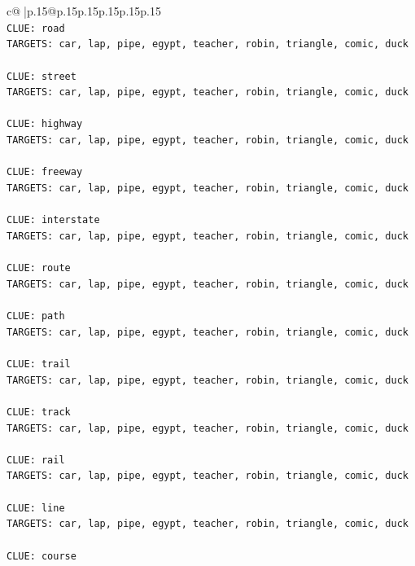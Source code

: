 \documentclass{article}
\begin{document}
{\begin{supertabular}{c@{$\;$}|p{.15\linewidth}@{}p{.15\linewidth}p{.15\linewidth}p{.15\linewidth}p{.15\linewidth}p{.15\linewidth}}
{{{\\ 
\texttt{CLUE: road} \\
\texttt{TARGETS: car, lap, pipe, egypt, teacher, robin, triangle, comic, duck} \\
\\ 
\texttt{CLUE: street} \\
\texttt{TARGETS: car, lap, pipe, egypt, teacher, robin, triangle, comic, duck} \\
\\ 
\texttt{CLUE: highway} \\
\texttt{TARGETS: car, lap, pipe, egypt, teacher, robin, triangle, comic, duck} \\
\\ 
\texttt{CLUE: freeway} \\
\texttt{TARGETS: car, lap, pipe, egypt, teacher, robin, triangle, comic, duck} \\
\\ 
\texttt{CLUE: interstate} \\
\texttt{TARGETS: car, lap, pipe, egypt, teacher, robin, triangle, comic, duck} \\
\\ 
\texttt{CLUE: route} \\
\texttt{TARGETS: car, lap, pipe, egypt, teacher, robin, triangle, comic, duck} \\
\\ 
\texttt{CLUE: path} \\
\texttt{TARGETS: car, lap, pipe, egypt, teacher, robin, triangle, comic, duck} \\
\\ 
\texttt{CLUE: trail} \\
\texttt{TARGETS: car, lap, pipe, egypt, teacher, robin, triangle, comic, duck} \\
\\ 
\texttt{CLUE: track} \\
\texttt{TARGETS: car, lap, pipe, egypt, teacher, robin, triangle, comic, duck} \\
\\ 
\texttt{CLUE: rail} \\
\texttt{TARGETS: car, lap, pipe, egypt, teacher, robin, triangle, comic, duck} \\
\\ 
\texttt{CLUE: line} \\
\texttt{TARGETS: car, lap, pipe, egypt, teacher, robin, triangle, comic, duck} \\
\\ 
\texttt{CLUE: course} \\
}}}
\end{supertabular}}
\end{document}
